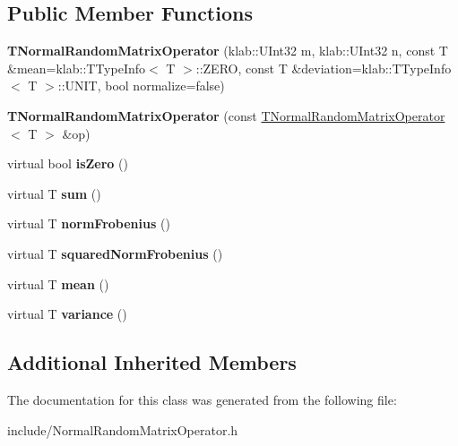 \subsection*{Public Member Functions}
\begin{DoxyCompactItemize}
\item 
{\bfseries T\+Normal\+Random\+Matrix\+Operator} (klab\+::\+U\+Int32 m, klab\+::\+U\+Int32 n, const T \&mean=klab\+::\+T\+Type\+Info$<$ T $>$\+::Z\+E\+RO, const T \&deviation=klab\+::\+T\+Type\+Info$<$ T $>$\+::U\+N\+IT, bool normalize=false)\hypertarget{classkl1p_1_1TNormalRandomMatrixOperator_af575dc6dc05d741997186bfe79e52e17}{}\label{classkl1p_1_1TNormalRandomMatrixOperator_af575dc6dc05d741997186bfe79e52e17}

\item 
{\bfseries T\+Normal\+Random\+Matrix\+Operator} (const \hyperlink{classkl1p_1_1TNormalRandomMatrixOperator}{T\+Normal\+Random\+Matrix\+Operator}$<$ T $>$ \&op)\hypertarget{classkl1p_1_1TNormalRandomMatrixOperator_a8a8b9e19650bb736ab96fe5a65ea1e19}{}\label{classkl1p_1_1TNormalRandomMatrixOperator_a8a8b9e19650bb736ab96fe5a65ea1e19}

\item 
virtual bool {\bfseries is\+Zero} ()\hypertarget{classkl1p_1_1TNormalRandomMatrixOperator_a71c73463963253940b05f2c4c21c9f94}{}\label{classkl1p_1_1TNormalRandomMatrixOperator_a71c73463963253940b05f2c4c21c9f94}

\item 
virtual T {\bfseries sum} ()\hypertarget{classkl1p_1_1TNormalRandomMatrixOperator_ac0906236a35d1173393ef34ef4d9629f}{}\label{classkl1p_1_1TNormalRandomMatrixOperator_ac0906236a35d1173393ef34ef4d9629f}

\item 
virtual T {\bfseries norm\+Frobenius} ()\hypertarget{classkl1p_1_1TNormalRandomMatrixOperator_a37e85d72c5b442eb70e7358de6f00c2d}{}\label{classkl1p_1_1TNormalRandomMatrixOperator_a37e85d72c5b442eb70e7358de6f00c2d}

\item 
virtual T {\bfseries squared\+Norm\+Frobenius} ()\hypertarget{classkl1p_1_1TNormalRandomMatrixOperator_a3d7244c12fef71a83c1b3e725d986c10}{}\label{classkl1p_1_1TNormalRandomMatrixOperator_a3d7244c12fef71a83c1b3e725d986c10}

\item 
virtual T {\bfseries mean} ()\hypertarget{classkl1p_1_1TNormalRandomMatrixOperator_a414e36fa1175eaf17fcdae23ad05faa7}{}\label{classkl1p_1_1TNormalRandomMatrixOperator_a414e36fa1175eaf17fcdae23ad05faa7}

\item 
virtual T {\bfseries variance} ()\hypertarget{classkl1p_1_1TNormalRandomMatrixOperator_a505304cee5b6b4b35e05241cb049d6f7}{}\label{classkl1p_1_1TNormalRandomMatrixOperator_a505304cee5b6b4b35e05241cb049d6f7}

\end{DoxyCompactItemize}
\subsection*{Additional Inherited Members}


The documentation for this class was generated from the following file\+:\begin{DoxyCompactItemize}
\item 
include/Normal\+Random\+Matrix\+Operator.\+h\end{DoxyCompactItemize}
